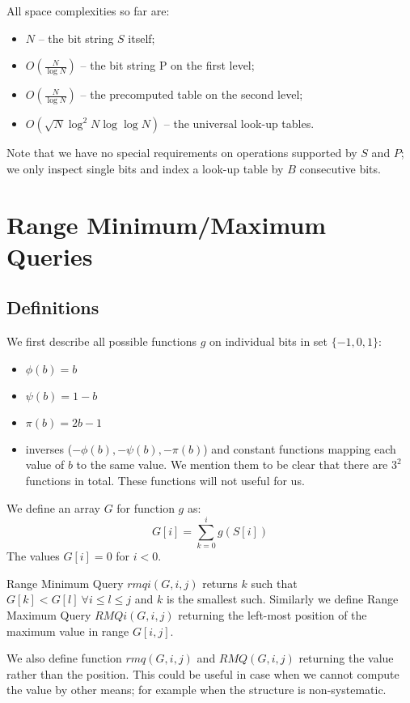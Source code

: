 \bigskip

All space complexities so far are:
\begin{itemize}
	\item $N$ -- the bit string $S$ itself;
	\item $O(\frac{N}{\log N})$ -- the bit string P on the first level;
	\item $O(\frac{N}{\log N})$ -- the precomputed table on the second level;
	\item $O(\sqrt{N}\log^2 N \log\log N)$ -- the universal look-up tables.
\end{itemize}
Note that we have no special requirements on operations supported by $S$ and $P$; we only inspect single bits and index a look-up table by $B$ consecutive bits.


\section{Range Minimum/Maximum Queries}


\subsection{\label{ss:rmq-def}Definitions}

We first describe all possible functions $g$ on individual bits in set $\{-1, 0, 1\}$:
\begin{itemize}
	\item $\phi(b) = b$
	\item $\psi(b) = 1 - b$
	\item $\pi(b) = 2 b - 1$
	\item inverses ($-\phi(b), -\psi(b), -\pi(b)$) and constant functions mapping each value of $b$ to the same value.
	We mention them to be clear that there are $3^2$ functions in total.
	These functions will not useful for us.
\end{itemize}

We define an array $G$ for function $g$ as:
$$G[i] = \sum_{k=0}^i g(S[i])$$
The values $G[i] = 0$ for $i < 0$.

\begin{defn}
Range Minimum Query $rmqi(G, i, j)$ returns $k$ such that $G[k] < G[l]\ \forall i \le l \le j$ and $k$ is the smallest such.
Similarly we define Range Maximum Query $RMQi(G, i, j)$ returning the left-most position of the maximum value in range $G[i, j]$.

We also define function $rmq(G, i, j)$ and $RMQ(G, i, j)$ returning the value rather than the position.
This could be useful in case when we cannot compute the value by other means; for example when the structure is non-systematic.
\end{defn}

